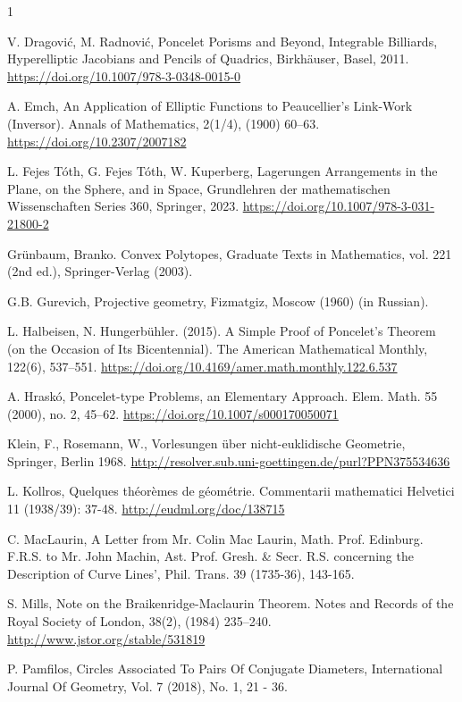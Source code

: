 \documentclass{birkjour}
\theoremstyle{definition}
\theoremstyle{remark}
\numberwithin{equation}{section}
\begin{document}
\begin{thebibliography}{1}
{ V. Dragović, M. Radnović, Poncelet Porisms and Beyond, Integrable Billiards, Hyperelliptic Jacobians and Pencils of Quadrics, Birkhäuser, Basel, 2011. \url{https://doi.org/10.1007/978-3-0348-0015-0}

 A. Emch, An Application of Elliptic Functions to Peaucellier’s Link-Work (Inversor). Annals of Mathematics, 2(1/4), (1900) 60–63. \url{https://doi.org/10.2307/2007182}

 L. Fejes Tóth, G. Fejes Tóth, W. Kuperberg, Lagerungen
Arrangements in the Plane, on the Sphere, and in Space, Grundlehren der mathematischen Wissenschaften Series 360, Springer, 2023. \url{https://doi.org/10.1007/978-3-031-21800-2}

 Grünbaum, Branko. Convex Polytopes, Graduate Texts in Mathematics, vol. 221 (2nd ed.), Springer-Verlag
(2003).

 G.B. Gurevich, Projective geometry, Fizmatgiz, Moscow (1960) (in Russian).

 L. Halbeisen, N. Hungerbühler. (2015). A Simple Proof of Poncelet’s Theorem (on the Occasion of Its Bicentennial). The American Mathematical Monthly, 122(6), 537–551. \url{https://doi.org/10.4169/amer.math.monthly.122.6.537}

 A. Hraskó, Poncelet-type Problems, an Elementary Approach. Elem. Math. 55 (2000), no. 2, 45–62. \url{https://doi.org/10.1007/s000170050071}

 Klein, F., Rosemann, W., Vorlesungen über nicht-euklidische Geometrie, Springer, Berlin 1968. \url{http://resolver.sub.uni-goettingen.de/purl?PPN375534636}

 L. Kollros, Quelques théorèmes de géométrie. Commentarii mathematici Helvetici 11 (1938/39): 37-48. \url{http://eudml.org/doc/138715}

 C. MacLaurin, A Letter from Mr. Colin Mac Laurin, Math. Prof. Edinburg.
F.R.S. to Mr. John Machin, Ast. Prof. Gresh. \& Secr. R.S. concerning the
Description of Curve Lines', Phil. Trans. 39 (1735-36), 143-165.

 S. Mills, Note on the Braikenridge-Maclaurin Theorem. Notes and Records of the Royal Society of London, 38(2), (1984) 235–240. \url{http://www.jstor.org/stable/531819}

 P. Pamfilos, Circles Associated To Pairs Of Conjugate Diameters, International Journal Of Geometry,
Vol. 7 (2018), No. 1, 21 - 36.

}
\end{thebibliography}
\end{document}
